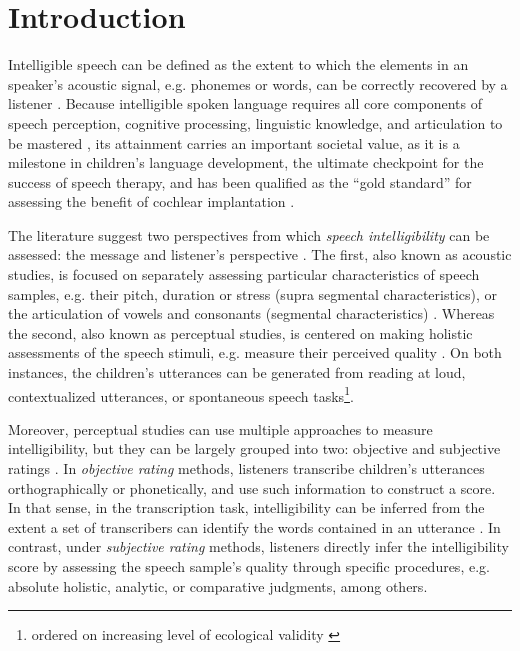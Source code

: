 \section{Introduction}

Intelligible speech can be defined as the extent to which the elements in an speaker's acoustic signal, e.g. phonemes or words, can be correctly recovered by a listener \citep{Kent_et_al_1989, Whitehill_et_al_2004, vanHeuven_2008, Freeman_et_al_2017}. Because intelligible spoken language requires all core components of speech perception, cognitive processing, linguistic knowledge, and articulation to be mastered \citep{Freeman_et_al_2017}, its attainment carries an important societal value, as it is a milestone in children's language development, the ultimate checkpoint for the success of speech therapy, and has been qualified as the ``gold standard'' for assessing the benefit of cochlear implantation \citep{Chin_et_al_2012}. 

The literature suggest two perspectives from which \textit{speech intelligibility} can be assessed: the message and listener's perspective \citep{Boonen_et_al_2020, Boonen_et_al_2021}. The first, also known as acoustic studies, is focused on separately assessing particular characteristics of speech samples, e.g. their pitch, duration or stress (supra segmental characteristics), or the articulation of vowels and consonants (segmental characteristics) \citep{Rowe_et_al_2018}. Whereas the second, also known as perceptual studies, is centered on making holistic assessments of the speech stimuli, e.g. measure their perceived quality \citep{Boonen_et_al_2020, Boonen_et_al_2021}. On both instances, the children's utterances can be generated from reading at loud, contextualized utterances, or spontaneous speech tasks\footnote{ordered on increasing level of ecological validity \citep{Flipsen_2006,Ertmer_2011}}.

\begin{comment}
Based on their description, it seems that perceptual are more subjective than acoustic studies, as they do not rely on "objective" measurements, i.e. time duration, wave amplitude, among others, available in the former. However, for the case of SI, there are objective and subjective assessment methodologies.
\end{comment}

Moreover, perceptual studies can use multiple approaches to measure intelligibility, but they can be largely grouped into two: objective and subjective ratings \citep{Hustad_et_al_2020}. In \textit{objective rating} methods, listeners transcribe children's utterances orthographically or phonetically, and use such information to construct a score. In that sense, in the transcription task, intelligibility can be inferred from the extent a set of transcribers can identify the words contained in an utterance \cite{Boonen_et_al_2021}. In contrast, under \textit{subjective rating} methods, listeners directly infer the intelligibility score by assessing the speech sample's quality through specific procedures, e.g. absolute holistic, analytic, or comparative judgments, among others. 

